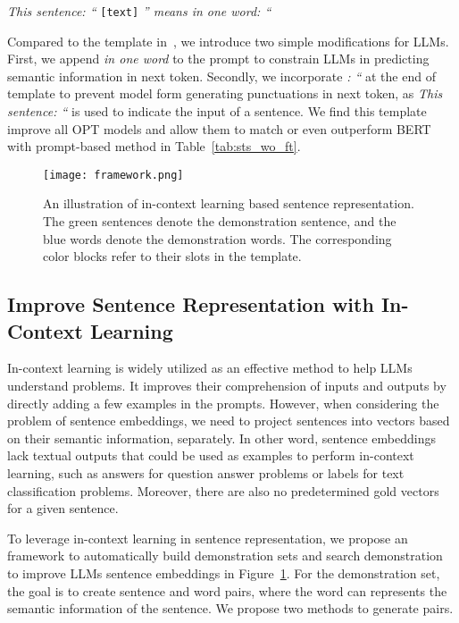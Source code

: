 \documentclass{article}
\begin{document}
\centerline{\textit{This sentence: ``} \texttt{[text]} \textit{'' means in one word: ``}}

Compared to the template in~\cite{jiang2022promptbert}, we introduce two simple modifications for LLMs.
First, we append \textit{in one word} to the prompt to constrain LLMs in predicting semantic information in next token.
Secondly, we incorporate \textit{: ``} at the end of template to prevent model form generating punctuations in next token, as \textit{This sentence: ``} is used to indicate the input of a sentence.
We find this template improve all OPT models and allow them to match or even outperform BERT with prompt-based method in Table~\ref{tab:sts_wo_ft}.

\begin{figure}
\centering
\texttt{[image: framework.png]}
\caption{
  An illustration of in-context learning based sentence representation.
  The \textcolor{greensentence}{green} sentences denote the demonstration sentence, and the \textcolor{blueword}{blue} words denote the demonstration words. The corresponding color blocks refer to their slots in the template.
} \label{fig:framework}
\end{figure}

\subsection{Improve Sentence Representation with In-Context Learning}\label{sec:method_icl}
In-context learning is widely utilized as an effective method to help LLMs understand problems.  It improves their comprehension of inputs and outputs by directly adding a few examples in the prompts.
However, when considering the problem of sentence embeddings, we need to project sentences into vectors based on their semantic information, separately.
In other word, sentence embeddings lack textual outputs that could be used as examples to perform in-context learning, such as answers for question answer problems or labels for text classification problems. Moreover, there are also no predetermined gold vectors for a given sentence.

To leverage in-context learning in sentence representation, we propose an framework to automatically build demonstration sets and search demonstration to improve LLMs sentence embeddings in Figure~\ref{fig:framework}.
For the demonstration set, the goal is to create sentence and word pairs, where the word can represents the semantic information of the sentence.
We propose two methods to generate pairs.
\end{document}
